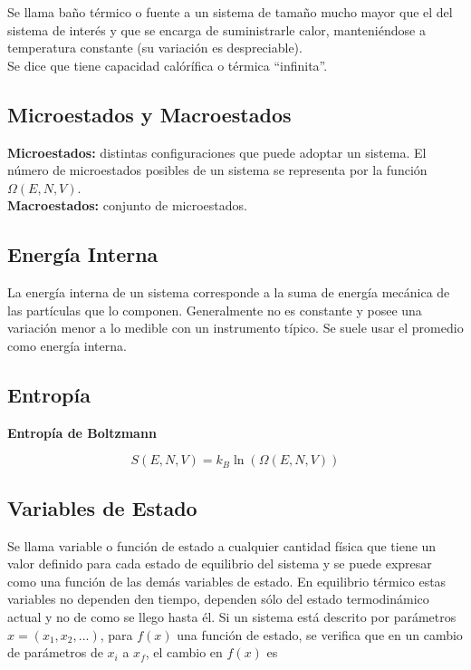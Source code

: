 Se llama baño térmico o fuente a un sistema de tamaño mucho mayor que el del sistema de interés y que se encarga de suministrarle calor, manteniéndose a temperatura constante (su variación es despreciable).\\
Se dice que tiene capacidad calórífica o térmica ``infinita''.

\subsection{Microestados y Macroestados}

\textbf{Microestados:} distintas configuraciones que puede adoptar un sistema. El número de microestados posibles de un sistema se representa por la función $\Omega(E, N, V)$.\\

\textbf{Macroestados:} conjunto de microestados.

\subsection{Energía Interna}

La energía interna de un sistema corresponde a la suma de energía mecánica de las partículas que lo componen. Generalmente no es constante y posee una variación menor a lo medible con un instrumento típico. Se suele usar el promedio como energía interna.

\subsection{Entropía}


\textbf{Entropía de Boltzmann}

\[S(E,N,V) = k_B\ln{(\Omega(E,N,V))}\]

\subsection{Variables de Estado}

Se llama variable o función de estado a cualquier cantidad física que tiene un valor definido para cada estado de equilibrio del sistema y se puede expresar como una función de las demás variables de estado. En equilibrio térmico estas variables no dependen den tiempo, dependen sólo del estado termodinámico actual y no de como se llego hasta él.
\medbreak
Si un sistema está descrito por parámetros $x=(x_1, x_2, ...)$, para $f(x)$ una función de estado, se verifica que en un cambio de parámetros de $x_i$ a $x_f$, el cambio en $f(x)$ es

